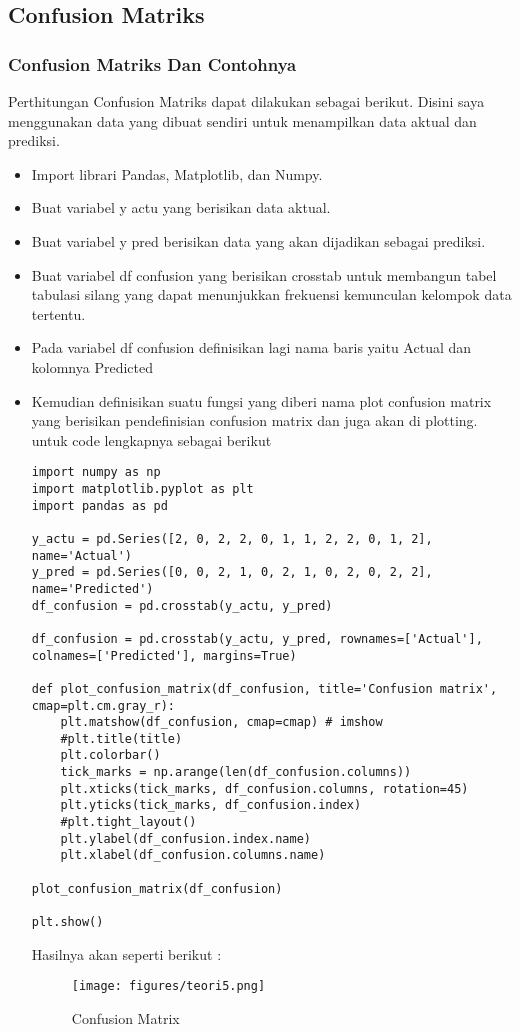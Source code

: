 \subsection{Confusion Matriks}
\subsubsection{Confusion Matriks Dan Contohnya}
Perthitungan Confusion Matriks dapat dilakukan sebagai berikut. Disini saya menggunakan data yang dibuat sendiri untuk menampilkan data aktual dan prediksi.
\begin{itemize}
\item
Import librari Pandas, Matplotlib, dan Numpy.
\item
Buat variabel y actu yang berisikan data aktual.
\item
Buat variabel y pred berisikan data yang akan dijadikan sebagai prediksi.
\item
Buat variabel df confusion yang berisikan crosstab untuk membangun tabel tabulasi silang yang dapat menunjukkan frekuensi kemunculan kelompok data tertentu.
\item
Pada variabel df confusion definisikan lagi nama baris yaitu Actual dan kolomnya Predicted
\item
Kemudian definisikan suatu fungsi yang diberi nama plot confusion matrix yang berisikan pendefinisian confusion matrix dan juga akan di plotting. untuk code lengkapnya sebagai berikut 
\begin{verbatim}
import numpy as np
import matplotlib.pyplot as plt
import pandas as pd

y_actu = pd.Series([2, 0, 2, 2, 0, 1, 1, 2, 2, 0, 1, 2], name='Actual')
y_pred = pd.Series([0, 0, 2, 1, 0, 2, 1, 0, 2, 0, 2, 2], name='Predicted')
df_confusion = pd.crosstab(y_actu, y_pred)

df_confusion = pd.crosstab(y_actu, y_pred, rownames=['Actual'], colnames=['Predicted'], margins=True)

def plot_confusion_matrix(df_confusion, title='Confusion matrix', cmap=plt.cm.gray_r):
    plt.matshow(df_confusion, cmap=cmap) # imshow
    #plt.title(title)
    plt.colorbar()
    tick_marks = np.arange(len(df_confusion.columns))
    plt.xticks(tick_marks, df_confusion.columns, rotation=45)
    plt.yticks(tick_marks, df_confusion.index)
    #plt.tight_layout()
    plt.ylabel(df_confusion.index.name)
    plt.xlabel(df_confusion.columns.name)

plot_confusion_matrix(df_confusion)

plt.show()
\end{verbatim}

\par

Hasilnya akan seperti berikut :
\begin{figure}[ht]
\centering
\texttt{[image: figures/teori5.png]}
\caption{Confusion Matrix}
\label{Contoh}
\end{figure}
\end{itemize}


